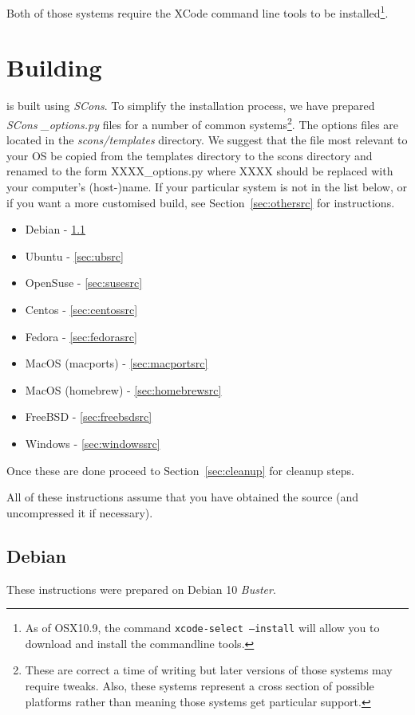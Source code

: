 \noindent Both of those systems require the XCode command line tools to be installed\footnote{As of OSX10.9, the
command \texttt{xcode-select --install} will allow you to download and install the commandline tools.}.

\section{Building}\label{sec:build}

\esfinley is built using \textit{SCons}. To simplify the installation process, we have prepared \textit{SCons} \textit{_options.py} files for a number of common systems\footnote{These are correct a time of writing but later versions of those systems may require tweaks.
Also, these systems represent a cross section of possible platforms rather than meaning those systems get particular support.}.
The options files are located in the \textit{scons/templates} directory. We suggest that the file most relevant to your OS
be copied from the templates directory to the scons directory and renamed to the form XXXX_options.py where XXXX
should be replaced with your computer's (host-)name.
If your particular system is not in the list below, or if you want a more customised
build,
see Section~\ref{sec:othersrc} for instructions.
\begin{itemize}
 \item Debian - \ref{sec:debsrc}
 \item Ubuntu - \ref{sec:ubsrc}
 \item OpenSuse - \ref{sec:susesrc}
 \item Centos - \ref{sec:centossrc}
 \item Fedora - \ref{sec:fedorasrc}
 \item MacOS (macports) - \ref{sec:macportsrc}
 \item MacOS (homebrew) - \ref{sec:homebrewsrc}
 \item FreeBSD - \ref{sec:freebsdsrc}
 \item Windows - \ref{sec:windowssrc}
\end{itemize}

Once these are done proceed to Section~\ref{sec:cleanup} for cleanup steps.

\noindent All of these instructions assume that you have obtained the \escript source (and uncompressed it if necessary).
\subsection{Debian}\label{sec:debsrc}
\noindent These instructions were prepared on Debian 10 \textit{Buster}.

